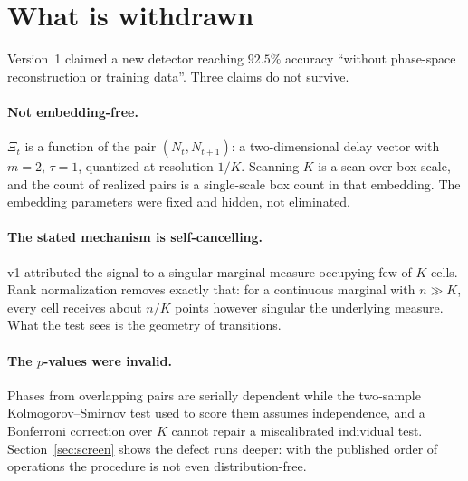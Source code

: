 \documentclass[11pt]{article}
\newcommand{\Xph}{\Xi}
\begin{document}
\begin{abstract}
No new detection principle is claimed --- the mechanism is the
forbidden/missing-pattern paradigm and coarse-grained transition statistics.
What is offered is a validated inference layer for those classical statistics,
a catalogue of the ways it fails, and a benchmark of 165 series whose 46 labeled
members are byte-reproducible and labeled by computed Lyapunov exponents. The
comparisons here are calibration on that set, not independent validation.
\end{abstract}

\section{What is withdrawn}

Version~1 claimed a new detector reaching $92.5\%$ accuracy ``without
phase-space reconstruction or training data''. Three claims do not survive.

\paragraph{Not embedding-free.} $\Xph_t$ is a function of the pair
$(N_t,N_{t+1})$: a two-dimensional delay vector with $m=2$, $\tau=1$, quantized
at resolution $1/K$. Scanning $K$ is a scan over box scale, and the count of
realized pairs is a single-scale box count in that embedding. The embedding
parameters were fixed and hidden, not eliminated.

\paragraph{The stated mechanism is self-cancelling.} v1 attributed the signal to
a singular marginal measure occupying few of $K$ cells. Rank normalization
removes exactly that: for a continuous marginal with $n\gg K$, every cell
receives about $n/K$ points however singular the underlying measure. What the
test sees is the geometry of transitions.

\paragraph{The $p$-values were invalid.} Phases from overlapping pairs are
serially dependent while the two-sample Kolmogorov--Smirnov test used to score
them assumes independence, and a Bonferroni correction over $K$ cannot repair a
miscalibrated individual test. Section~\ref{sec:screen} shows the defect runs
deeper: with the published order of operations the procedure is not even
distribution-free.
\end{document}
